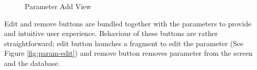 \begin{figure}
	\centering
	\caption{Parameter Add View}
	\label{fig:param-add}
\end{figure}

Edit and remove buttons are bundled together with the parameters to provide and intuitive user experience. Behaviour of these buttons are rather straightforward; edit button launches a fragment to edit the parameter (See Figure \ref{fig:param-edit}) and remove button removes parameter from the screen and the database.

